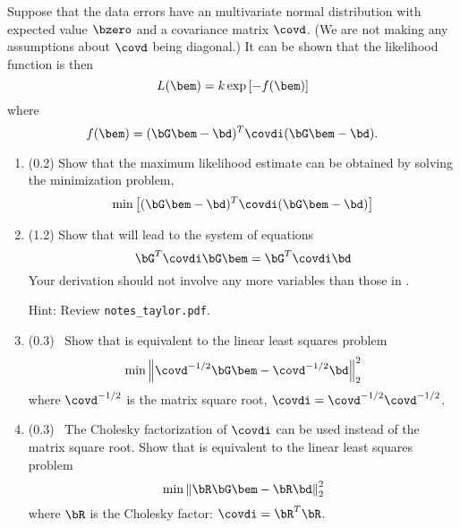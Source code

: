 \documentclass[11pt,titlepage,fleqn]{article}
\begin{document}
Suppose that the data errors have an multivariate normal distribution with expected value $\bzero$ and a covariance matrix $\covd$. (We are not making any assumptions about $\covd$ being diagonal.) It can be shown that the likelihood function is then
%
\begin{equation}
L(\bem) = k \exp \left[ -f(\bem) \right]
\end{equation}
%
where
%
\begin{equation}
f(\bem) = (\bG\bem - \bd)^T \covdi (\bG\bem - \bd).
\label{fm}
\end{equation}
%
\begin{enumerate}
\item (0.2) Show that the maximum likelihood estimate can be obtained by solving the minimization problem,
%
\begin{equation}
\min \left[ (\bG\bem - \bd)^T \covdi (\bG\bem - \bd) \right]
\label{min}
\end{equation}


\item (1.2) Show that  will lead to the system of equations
%
\begin{equation}
\bG^T \covdi \bG \bem = \bG^T \covdi \bd
\end{equation}
%
Your derivation should not involve any more variables than those in .

Hint: Review \verb+notes_taylor.pdf+.


\item (0.3) \ptag\ Show that  is equivalent to the linear least squares problem
%
\begin{equation}
\min\left\|  \covd^{-1/2}\bG\bem - \covd^{-1/2}\bd  \right\|_2^2
\end{equation}
%
where $\covd^{-1/2}$ is the matrix square root, \ie $\covdi = \covd^{-1/2} \covd^{-1/2}$.


\item (0.3) \ptag\ The Cholesky factorization of $\covdi$ can be used instead of the matrix square root. Show that  is equivalent to the linear least squares problem
%
\begin{equation}
\min\left\|  \bR\bG\bem - \bR\bd  \right\|_2^2
\end{equation}
%
where $\bR$ is the Cholesky factor: $\covdi = \bR^T\bR$.

\end{enumerate}
\end{document}
